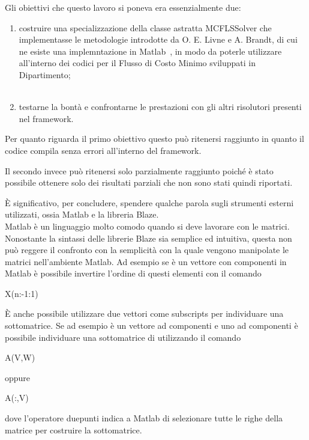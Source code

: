
Gli obiettivi che questo lavoro si poneva era essenzialmente due:

\begin{enumerate}
\item costruire una specializzazione della classe astratta MCFLSSolver che implementasse le metodologie introdotte da O. E. Livne e A. Brandt, di cui ne esiste una implemntazione in Matlab~\cite{lamg_code}, in modo da poterle utilizzare all'interno dei codici per il Flusso di Costo Minimo sviluppati in Dipartimento;\\
\\
\item testarne la bontà e confrontarne le prestazioni con gli altri risolutori presenti nel framework.
\end{enumerate}

Per quanto riguarda il primo obiettivo questo può ritenersi raggiunto in quanto il codice compila senza errori all'interno del framework.

Il secondo invece può ritenersi solo parzialmente raggiunto poiché è stato possibile ottenere solo dei risultati parziali che non sono stati quindi riportati.

È significativo, per concludere, spendere qualche parola sugli strumenti esterni utilizzati, ossia Matlab e la libreria Blaze.
\\
Matlab è un linguaggio molto comodo quando si deve lavorare con le matrici.
Nonostante la sintassi delle librerie Blaze sia semplice ed intuitiva, questa non può reggere il confronto con la semplicità con la quale vengono manipolate le matrici nell'ambiente Matlab.
Ad esempio se  è un vettore con  componenti in Matlab è possibile invertire l'ordine di questi elementi con il comando
\begin{codice}
X(n:-1:1)
\end{codice}

È anche possibile utilizzare due vettori come subscripts per individuare una sottomatrice. 
Se ad esempio  è un vettore ad  componenti e  uno ad  componenti è possibile individuare una sottomatrice di  utilizzando il comando
\begin{codice}
A(V,W)
\end{codice}
oppure
\begin{codice}
A(:,V) 
\end{codice}
dove l'operatore duepunti indica a Matlab di selezionare tutte le righe della matrice  per costruire la sottomatrice.

